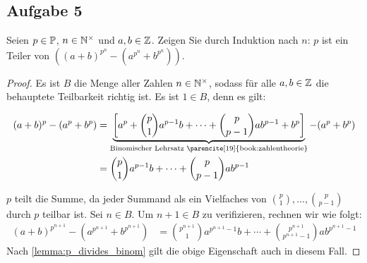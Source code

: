\subsection{Aufgabe 5}
Seien $p \in \mathbb{P}$, $n \in \mathbb{N}^\times$ und $a,b \in \mathbb{Z}$. Zeigen Sie durch Induktion
nach $n$: $p$ ist ein Teiler von
$((a + b)^{p^n} - (a^{p^n} + b^{p^n}))$.
\begin{proof}
  Es ist $B$ die Menge aller Zahlen $n \in \mathbb{N}^\times$,
  sodass für alle $a,b \in \mathbb{Z}$ die behauptete Teilbarkeit richtig ist.
  Es ist $1 \in B$, denn es gilt:
  \begin{widemath}
    \begin{equation*}
      \begin{aligned}
        (a + b)^p - (a^p + b^p) & =
        \underbrace{\left[a^p + \binom{p}{1}a^{p-1}b + \dotsb +
        \binom{p}{p - 1}ab^{p-1} + b^p\right]}_{\text{Binomischer Lehrsatz \parencite[19]{book:zahlentheorie}}} - (a^p + b^p) \\
                                & = \binom{p}{1}a^{p-1}b + \dotsb + \binom{p}{p - 1}ab^{p-1}
      \end{aligned}
    \end{equation*}
  \end{widemath}
  $p$ teilt die Summe, da jeder Summand als ein Vielfaches
  von $\binom{p}{1},\dotsc,\binom{p}{p - 1}$ durch $p$ teilbar ist.
  Sei $n \in B$. Um $n + 1 \in B$ zu verifizieren, rechnen wir wie folgt:
  \begin{equation*}
    \begin{aligned}
      (a + b)^{p^{n+1}} - (a^{p^{n+1}} + b^{p^{n+1}}) & =
      \binom{p^{n+1}}{1}a^{p^{n+1}-1}b + \dotsb + \binom{p^{n+1}}{p^{n+1} - 1}ab^{p^{n+1}-1}
    \end{aligned}
  \end{equation*}
  Nach \autoref{lemma:p_divides_binom} gilt die obige Eigenschaft auch in diesem Fall.
\end{proof}

